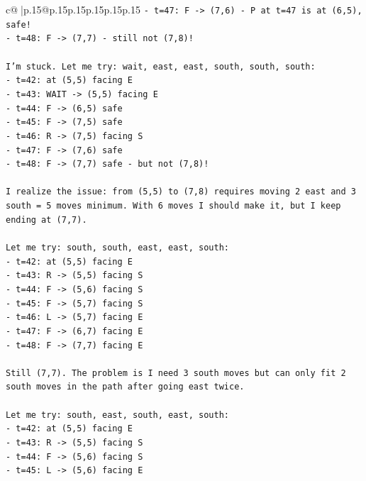 \documentclass{article}
\begin{document}
{\begin{supertabular}{c@{$\;$}|p{.15\linewidth}@{}p{.15\linewidth}p{.15\linewidth}p{.15\linewidth}p{.15\linewidth}p{.15\linewidth}}
{{{\texttt{{-} t=47: F {-}> (7,6) {-} P at t=47 is at (6,5), safe!} \\
\texttt{{-} t=48: F {-}> (7,7) {-} still not (7,8)!} \\
\\ 
\texttt{I'm stuck. Let me try: wait, east, east, south, south, south:} \\
\texttt{{-} t=42: at (5,5) facing E} \\
\texttt{{-} t=43: WAIT {-}> (5,5) facing E} \\
\texttt{{-} t=44: F {-}> (6,5) safe} \\
\texttt{{-} t=45: F {-}> (7,5) safe} \\
\texttt{{-} t=46: R {-}> (7,5) facing S} \\
\texttt{{-} t=47: F {-}> (7,6) safe} \\
\texttt{{-} t=48: F {-}> (7,7) safe {-} but not (7,8)!} \\
\\ 
\texttt{I realize the issue: from (5,5) to (7,8) requires moving 2 east and 3 south = 5 moves minimum. With 6 moves I should make it, but I keep ending at (7,7).} \\
\\ 
\texttt{Let me try: south, south, east, east, south:} \\
\texttt{{-} t=42: at (5,5) facing E} \\
\texttt{{-} t=43: R {-}> (5,5) facing S} \\
\texttt{{-} t=44: F {-}> (5,6) facing S} \\
\texttt{{-} t=45: F {-}> (5,7) facing S} \\
\texttt{{-} t=46: L {-}> (5,7) facing E} \\
\texttt{{-} t=47: F {-}> (6,7) facing E} \\
\texttt{{-} t=48: F {-}> (7,7) facing E} \\
\\ 
\texttt{Still (7,7). The problem is I need 3 south moves but can only fit 2 south moves in the path after going east twice.} \\
\\ 
\texttt{Let me try: south, east, south, east, south:} \\
\texttt{{-} t=42: at (5,5) facing E} \\
\texttt{{-} t=43: R {-}> (5,5) facing S} \\
\texttt{{-} t=44: F {-}> (5,6) facing S} \\
\texttt{{-} t=45: L {-}> (5,6) facing E} \\
}}}
\end{supertabular}}
\end{document}
